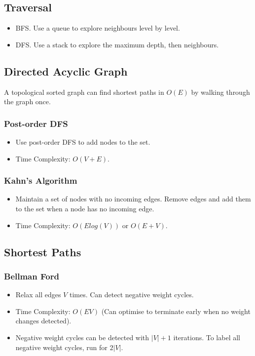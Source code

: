 \documentclass[10pt,landscape,a4paper]{article}
\begin{document}
\begin{multicols*}{4}
\subsection{Traversal}
\begin{itemize}
    \item BFS. Use a queue to explore neighbours level by level.
    \item DFS. Use a stack to explore the maximum depth, then neighbours.
\end{itemize}

\subsection{Directed Acyclic Graph}
A topological sorted graph can find shortest paths in $O(E)$ by walking through the graph once.
\subsubsection{Post-order DFS}
\begin{itemize}
    \item Use post-order DFS to add nodes to the set.
    \item Time Complexity: $O(V+E)$.
\end{itemize}

\subsubsection{Kahn's Algorithm}
\begin{itemize}
    \item Maintain a set of nodes with no incoming edges. Remove edges and add them to the set when a node has no incoming edge. 
    \item Time Complexity: $O(E log(V))$ or $O(E +V)$.
\end{itemize}

\subsection{Shortest Paths}
\subsubsection{Bellman Ford}
\begin{itemize}
    \item Relax all edges $V$ times. Can detect negative weight cycles. 
    \item Time Complexity: $O(EV)$ (Can optimise to terminate early when no weight changes detected). 
    \item Negative weight cycles can be detected with $|V| + 1$ iterations. To label all negative weight cycles, run for $2|V|$. 
\end{itemize}


\end{multicols*}
\end{document}
